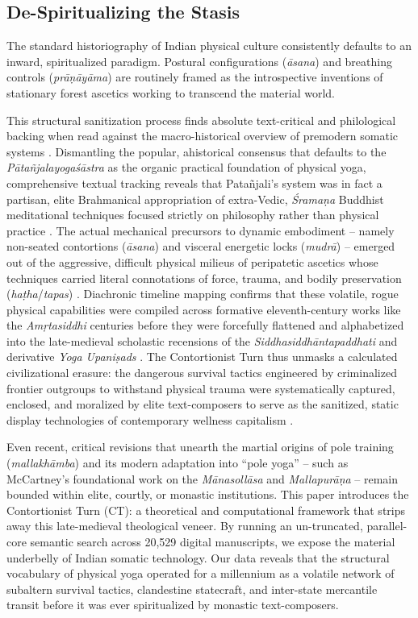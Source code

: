 \documentclass[11pt,twoside,letterpaper]{article}
\begin{document}
\subsection{De-Spiritualizing the Stasis}
The standard historiography of Indian physical culture consistently defaults to an inward, spiritualized paradigm. Postural configurations (\textit{āsana}) and breathing controls (\textit{prāṇāyāma}) are routinely framed as the introspective inventions of stationary forest ascetics working to transcend the material world.

This structural sanitization process finds absolute text-critical and philological backing when read against the macro-historical overview of premodern somatic systems \citep{Mallinson2017}. Dismantling the popular, ahistorical consensus that defaults to the \textit{Pātañjalayogaśāstra} as the organic practical foundation of physical yoga, comprehensive textual tracking reveals that Patañjali’s system was in fact a partisan, elite Brahmanical appropriation of extra-Vedic, \textit{Śramaṇa} Buddhist meditational techniques focused strictly on philosophy rather than physical practice \citep{Mallinson2017}. The actual mechanical precursors to dynamic embodiment – namely non-seated contortions (\textit{āsana}) and visceral energetic locks (\textit{mudrā}) – emerged out of the aggressive, difficult physical milieus of peripatetic ascetics whose techniques carried literal connotations of force, trauma, and bodily preservation (\textit{haṭha}/\textit{tapas}) \citep{Mallinson2017}. Diachronic timeline mapping confirms that these volatile, rogue physical capabilities were compiled across formative eleventh-century works like the \textit{Amṛtasiddhi} centuries before they were forcefully flattened and alphabetized into the late-medieval scholastic recensions of the \textit{Siddhasiddhāntapaddhati} and derivative \textit{Yoga Upaniṣads} \citep{Birch2024, Mallinson2017}. The Contortionist Turn thus unmasks a calculated civilizational erasure: the dangerous survival tactics engineered by criminalized frontier outgroups to withstand physical trauma were systematically captured, enclosed, and moralized by elite text-composers to serve as the sanitized, static display technologies of contemporary wellness capitalism \citep{Debnath2024, Mallinson2017, McCartney2021}.

Even recent, critical revisions that unearth the martial origins of pole training (\textit{mallakhāmba}) and its modern adaptation into “pole yoga” – such as McCartney’s foundational work on the \textit{Mānasollāsa} and \textit{Mallapurāṇa} – remain bounded within elite, courtly, or monastic institutions. This paper introduces the Contortionist Turn (CT): a theoretical and computational framework that strips away this late-medieval theological veneer. By running an un-truncated, parallel-core semantic search across 20,529 digital manuscripts, we expose the material underbelly of Indian somatic technology. Our data reveals that the structural vocabulary of physical yoga operated for a millennium as a volatile network of subaltern survival tactics, clandestine statecraft, and inter-state mercantile transit before it was ever spiritualized by monastic text-composers.
\end{document}
